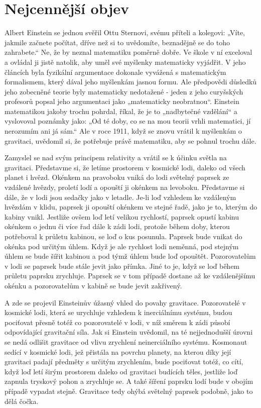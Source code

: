 \section{Nejcennější objev}\label{kulIchIIIsecIII}
  Albert Einstein se jednou svěřil Ottu Sternovi, svému příteli a kolegovi: „Víte, jakmile začnete
  počítat, dříve než si to uvědomíte, beznadějně se do toho zahrabete.“ Ne, že by neznal matematiku
  poměrně dobře. Ve škole v ní exceloval a ovládal ji jistě natolik, aby uměl své myšlenky
  matematicky vyjádřit. V jeho článcích byla fyzikální argumentace dokonale vyvážená s matematickým
  formalismem, který dával jeho myšlenkám jasnou formu. Ale předpovědi důsledků jeho zobecněné
  teorie byly matematicky nedotažené - jeden z jeho curyšských profesorů popsal jeho argumentaci
  jako „matematicky neobratnou“. Einstein matematikou jakoby trochu pohrdal, říkal, že je to
  „nadbytečné vzdělání“ a vyslovoval poznámky jako: „Od té doby, co se na mou teorii vrhli
  matematici, jí nerozumím ani já sám.“ Ale v roce 1911, když se znovu vrátil k myšlenkám o
  gravitaci, uvědomil si, že potřebuje právě matematiku, aby se pohnul trochu dále. 
  
  Zamyslel se nad svým principem relativity a vrátil se k účinku světla na gravitaci. Představme si,
  že letíme prostorem v kosmické lodi, daleko od všech planet i hvězd. Okénkem na pravoboku vniká do
  lodi světelný paprsek ze vzdálené hvězdy, proletí lodí a opouští ji okénkem na levoboku.
  Představme si dále, že v lodi jsou sedačky jako v letadle. Je-li loď vzhledem ke vzdáleným hvězdám
  v klidu, paprsek ji opouští okénkem ve stejné řadě, jako je to, kterým do kabiny vnikl. Jestliže
  ovšem loď letí velikou rychlostí, paprsek opustí kabinu okénkem o jednu či více řad dále k zádi
  lodi, protože během doby, kterou potřeboval k průletu kabinou, se loď o kus posunula. Paprsek bude
  vnikat do okénka pod určitým úhlem. Když je ale rychlost lodi neměnná, pod stejným úhlem se bude
  šířit kabinou a pod týmž úhlem bude loď opouštět. Pozorovatelům v lodi se paprsek bude stále jevit
  jako přímka. Jiné to je, když se loď během průletu paprsku zrychluje. Paprsek se v tom případě
  dostane až ke vzdálenějšímu okénku a pozorovatelům v kabině se bude jevit zakřivený. 
  
  A zde se projevil Einsteinův úžasný vhled do povahy gravitace. Pozorovatelé v kosmické lodi, která
  se urychluje vzhledem k inerciálnímu systému, budou pociťovat přesně totéž co pozorovatelé v lodi,
  v níž směrem k zádi působí odpovídající gravitační síla. Jak si Einstein uvědomil, na té
  nejjednodušší úrovni se nedá odlišit gravitace od vlivu zrychlení neinerciálního systému.
  Kosmonaut sedící v kosmické lodi, jež přistála na povrchu planety, na kterou díky její gravitaci
  padají předměty s určitým zrychlením, bude pociťovat totéž, co cítí, když loď letí širým prostorem
  daleko od gravitaci budících těles, jestliže loď zapnula tryskový pohon a zrychluje se. A také
  šíření paprsku lodí bude v obojím případě vypadat stejně. Gravitace tedy ohýbá světelný paprsek
  podobně, jako to dělá čočka. 
  

